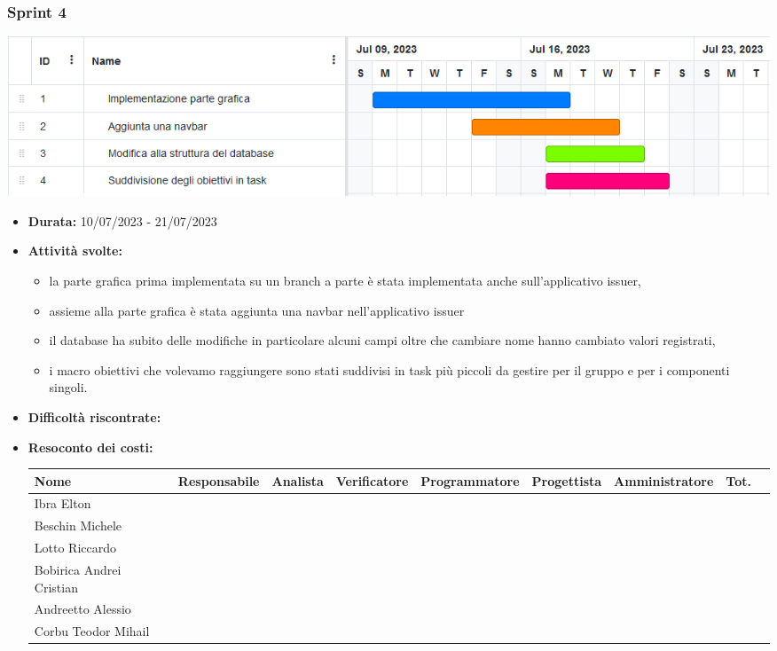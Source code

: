 \subsubsection{Sprint 4}
\begin{center}
    \includegraphics[scale = 0.5]{./res/img/Sprint_4.png}
  \end{center}
\begin{itemize}
    \item \textbf{Durata:} 10/07/2023 - 21/07/2023 
    \item \textbf{Attività svolte:}
    \begin{itemize}
        \item la parte grafica prima implementata su un branch a parte è stata implementata anche sull'applicativo issuer,
        \item assieme alla parte grafica è stata aggiunta una navbar nell'applicativo issuer 
        \item il database ha subito delle modifiche in particolare alcuni campi oltre che cambiare nome hanno cambiato valori registrati,
        \item i macro obiettivi che volevamo raggiungere sono stati suddivisi in task più piccoli da gestire per il gruppo e per i componenti singoli.
    \end{itemize}
    \item \textbf{Difficoltà riscontrate:}
    \item \textbf{Resoconto dei costi:}
    \begin{longtable}{|p{}|c|c|c|c|c|c|c|c|}
        \hline
        Nome & Responsabile & Analista & Verificatore & Programmatore & Progettista & Amministratore & Tot.\\
        \hline
        Ibra Elton & & & & & & &\\
        \hline
        Beschin Michele & & & & & & & \\
        \hline
        Lotto Riccardo & & & & & & & \\
        \hline
        Bobirica Andrei Cristian & & & & & & & \\
        \hline
        Andreetto Alessio & & & & & & & \\
        \hline
        Corbu Teodor Mihail & & & & & & & \\
        \hline
    \end{longtable}
    \end{itemize}
